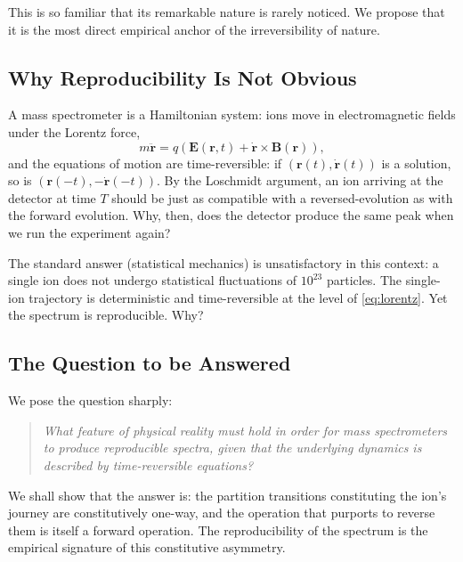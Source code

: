 \documentclass[twocolumn,10pt,a4paper]{article}
\theoremstyle{definition}
\theoremstyle{remark}
\begin{document}
This is so familiar that its remarkable nature is rarely noticed. We propose that it is the most direct empirical anchor of the irreversibility of nature.

\subsection{Why Reproducibility Is Not Obvious}

A mass spectrometer is a Hamiltonian system: ions move in electromagnetic fields under the Lorentz force,
\begin{equation}
    m\ddot{\mathbf{r}} = q\left(\mathbf{E}(\mathbf{r}, t) + \dot{\mathbf{r}} \times \mathbf{B}(\mathbf{r})\right),
    \label{eq:lorentz}
\end{equation}
and the equations of motion are time-reversible: if $(\mathbf{r}(t), \dot{\mathbf{r}}(t))$ is a solution, so is $(\mathbf{r}(-t), -\dot{\mathbf{r}}(-t))$. By the Loschmidt argument, an ion arriving at the detector at time $T$ should be just as compatible with a reversed-evolution as with the forward evolution. Why, then, does the detector produce the same peak when we run the experiment again?

The standard answer (statistical mechanics) is unsatisfactory in this context: a single ion does not undergo statistical fluctuations of $10^{23}$ particles. The single-ion trajectory is deterministic and time-reversible at the level of \eqref{eq:lorentz}. Yet the spectrum is reproducible. Why?

\subsection{The Question to be Answered}

We pose the question sharply:

\begin{quote}
\emph{What feature of physical reality must hold in order for mass spectrometers to produce reproducible spectra, given that the underlying dynamics is described by time-reversible equations?}
\end{quote}

We shall show that the answer is: the partition transitions constituting the ion's journey are constitutively one-way, and the operation that purports to reverse them is itself a forward operation. The reproducibility of the spectrum is the empirical signature of this constitutive asymmetry.

\end{document}

